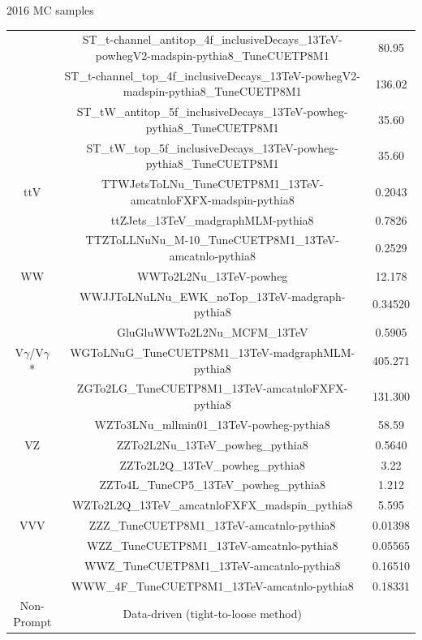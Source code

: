 \documentclass[8pt]{beamer}
\begin{document}
\begin{frame}{2016 MC samples}
\begin{table}
\begin{center}
{\begin{tabular}{ c|c|c }
& ST\_t-channel\_antitop\_4f\_inclusiveDecays\_13TeV-powhegV2-madspin-pythia8\_TuneCUETP8M1 & 80.95 \\
& ST\_t-channel\_top\_4f\_inclusiveDecays\_13TeV-powhegV2-madspin-pythia8\_TuneCUETP8M1 & 136.02 \\
& ST\_tW\_antitop\_5f\_inclusiveDecays\_13TeV-powheg-pythia8\_TuneCUETP8M1 & 35.60 \\
& ST\_tW\_top\_5f\_inclusiveDecays\_13TeV-powheg-pythia8\_TuneCUETP8M1 & 35.60 \\
\hline
\multirow{1}{*}{ttV} & TTWJetsToLNu\_TuneCUETP8M1\_13TeV-amcatnloFXFX-madspin-pythia8 & 0.2043 \\
& ttZJets\_13TeV\_madgraphMLM-pythia8 & 0.7826 \\
& TTZToLLNuNu\_M-10\_TuneCUETP8M1\_13TeV-amcatnlo-pythia8 & 0.2529 \\
\hline
WW & WWTo2L2Nu\_13TeV-powheg & 12.178 \\
& WWJJToLNuLNu\_EWK\_noTop\_13TeV-madgraph-pythia8 & 0.34520 \\
& GluGluWWTo2L2Nu\_MCFM\_13TeV & 0.5905 \\
\hline
V$\gamma$/V$\gamma$* & WGToLNuG\_TuneCUETP8M1\_13TeV-madgraphMLM-pythia8 & 405.271 \\ 
& ZGTo2LG\_TuneCUETP8M1\_13TeV-amcatnloFXFX-pythia8 & 131.300 \\
& WZTo3LNu\_mllmin01\_13TeV-powheg-pythia8 & 58.59 \\
\hline
VZ & ZZTo2L2Nu\_13TeV\_powheg\_pythia8 & 0.5640 \\
& ZZTo2L2Q\_13TeV\_powheg\_pythia8 & 3.22 \\
& ZZTo4L\_TuneCP5\_13TeV\_powheg\_pythia8 & 1.212 \\
& WZTo2L2Q\_13TeV\_amcatnloFXFX\_madspin\_pythia8 & 5.595 \\
 \hline
 VVV & ZZZ\_TuneCUETP8M1\_13TeV-amcatnlo-pythia8 & 0.01398 \\
 & WZZ\_TuneCUETP8M1\_13TeV-amcatnlo-pythia8 & 0.05565 \\
 & WWZ\_TuneCUETP8M1\_13TeV-amcatnlo-pythia8 & 0.16510 \\
 & WWW\_4F\_TuneCUETP8M1\_13TeV-amcatnlo-pythia8 & 0.18331 \\
 \hline
 Non-Prompt & Data-driven (tight-to-loose method) & \\
 \hline
\end{tabular}
}
\end{center}
\end{table}
\end{frame}
\end{document}
